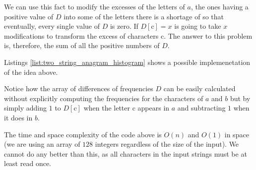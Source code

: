 We can use this fact to modify the excesses of the letters of $a$, the ones having a positive value of $D$ into some of the letters there is a shortage of so that eventually, every single value of $D$ is zero.
If $D[\mathrm{c}] = x$ is going to take $x$ modifications to transform the excess of characters $\mathrm{c}$.
The answer to this problem is, therefore, the sum of all the positive numbers of $D$. 

Listings \ref{list:two_string_anagram_histogram} shows a possible implemenetation of the idea above.



Notice how the array of differences of frequencies $D$ can be easily calculated without explicitly
computing the frequencies for the characters of $a$ and $b$ but by simply adding $1$ to $D[\mathrm{c}]$ when the letter $\mathrm{c}$ appears in $a$
and subtracting $1$ when it does in $b$. 

The time and space complexity of the code above is $O(n)$ and $O(1)$ in space (we are using an array of $128$ integers regardless of the size of the input). We cannot do any better than this, as all characters in the input strings must be at least read once.




